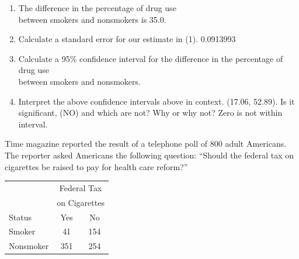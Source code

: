 \documentclass[11pt, chapterprefix=true]{scrbook}\usepackage[]{graphicx}\usepackage[]{color}
\begin{document}
\begin{exercises}
\begin{exercise}
  \end{exercise}
  \begin{solution}  %



\begin{enumerate}
\item The difference in the percentage of drug use \\ between smokers and nonsmokers is 35.0.
\item Calculate a standard error for our estimate in (1).  0.0913993
\item Calculate a 95\% confidence interval for the difference in the percentage of drug use \\ between smokers and nonsmokers.
\item Interpret the above confidence intervals above in context.  (17.06, 52.89). Is it significant, (NO) and which are not? Why or why not? Zero is not within interval.
\end{enumerate}

  \end{solution}

  \begin{exercise} %

Time magazine reported the result of a telephone poll of 800 adult Americans. The reporter asked Americans the following question: ``Should the federal tax on cigarettes be raised to pay for health care reform?''

\begin{table}[ht]
\centering
\begin{tabular}{@{} lcc @{}} \hline
 & \multicolumn{2}{c}{Federal Tax} \\
  & \multicolumn{2}{c}{on Cigarettes} \\
Status & Yes & No \\ \hline
Smoker & 41 & 154 \\
Nonsmoker & 351 & 254 \\ \hline
\end{tabular}
\end{table}


\end{exercise}
\end{exercises}
\end{document}
